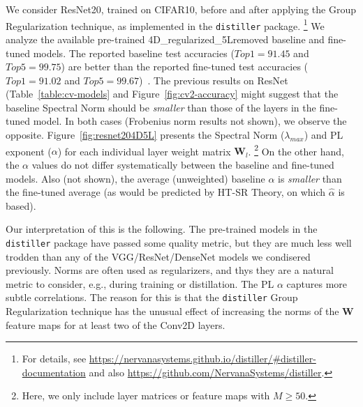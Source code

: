 We consider ResNet20, trained on CIFAR10, before and after applying the Group Regularization technique, as implemented in the \texttt{distiller} package.%
\footnote{For details, see \url{https://nervanasystems.github.io/distiller/\#distiller-documentation} and also \url{https://github.com/NervanaSystems/distiller}.}
We analyze the available pre-trained 4D\_regularized\_5Lremoved baseline and fine-tuned models.  %
The reported baseline test accuracies ($Top1=91.45$ and $Top5=99.75$) are better than the reported fine-tuned test accuracies ($Top1=91.02$ and $Top5=99.67$)~\cite{XXX-XXX}.
The previous results on ResNet (Table~\ref{table:cv-models} and Figure~\ref{fig:cv2-accuracy} might suggest that the baseline Spectral Norm should be \emph{smaller} than those of the layers in the fine-tuned model.
In both cases (Frobenius norm results not shown), we observe the opposite.
Figure~\ref{fig:resnet204D5L} presents the Spectral Norm ($\lambda_{max}$) and PL exponent ($\alpha$) for each individual layer weight matrix $\mathbf{W}_{l}$.%
\footnote{Here, we only include layer matrices or feature maps with $M\ge50$.}
On the other hand, the $\alpha$ values do not differ systematically between the baseline and fine-tuned models.
Also (not shown), the average (unweighted) baseline $\alpha$ is \emph{smaller} than the fine-tuned average (as would be predicted by HT-SR Theory, on which $\hat{\alpha}$ is based).


Our interpretation of this is the following.
The pre-trained models in the \texttt{distiller} package have passed some quality metric, but they are much less well trodden than any of the VGG/ResNet/DenseNet models we condisered previously.
Norms are often used as regularizers, and thys they are a natural metric to consider, e.g., during training or distillation.
The PL $\alpha$ captures more subtle correlations.
%
The reason for this is that the \texttt{distiller} Group Regularization technique has the unusual effect of increasing the norms of the $\mathbf{W}$ feature maps for at least two of the Conv2D layers.


